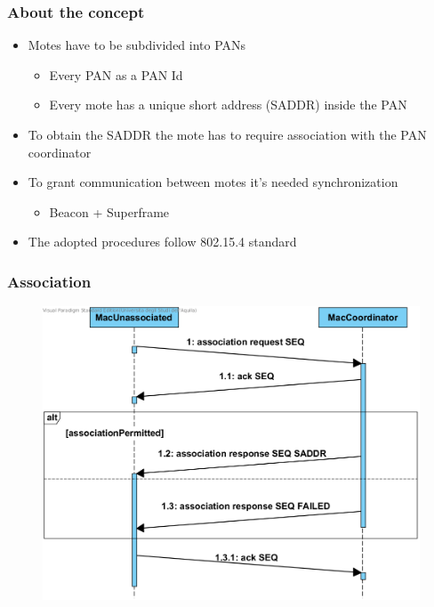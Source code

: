 \begin{frame}[fragile]
  \frametitle{About the concept}
  \begin{itemize}
    \item Motes have to be subdivided into PANs
    \begin{itemize}
    	\item Every PAN as a PAN Id
    	\item Every mote has a unique short address (SADDR) inside the PAN
    \end{itemize}
    \item To obtain the SADDR the mote has to require association with the PAN coordinator
    \item To grant communication between motes it's needed synchronization
    \begin{itemize}
      \item Beacon + Superframe
    \end{itemize}
    \item The adopted procedures follow 802.15.4 standard
  \end{itemize}

\end{frame}

\begin{frame}[fragile]
  \frametitle{Association}
  \begin{figure}
    \centering
    \includegraphics[width=.8\textwidth]{img/Association.png}
  \end{figure}
\end{frame}

